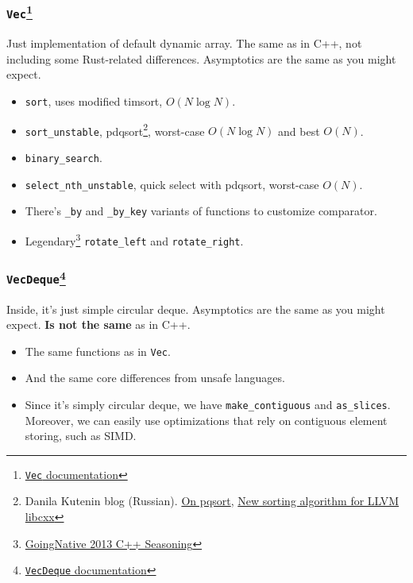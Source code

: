 \documentclass[aspectratio=1610,t]{beamer}
\begin{document}
\begin{frame}[fragile]
\frametitle{\texttt{Vec}\footnote{\href{https://doc.rust-lang.org/std/vec/struct.Vec.html}{\texttt{Vec} documentation}}}
Just implementation of default dynamic array. The same as in C++, not including some Rust-related differences. Asymptotics are the same as you might expect.

\begin{itemize}
    \item<3-> \texttt{sort}, uses modified timsort, $O(N\log N)$.
    \item<4-> \texttt{sort\_unstable}, pdqsort\footnote{Danila Kutenin blog (Russian). \href{https://t.me/experimentalchill/7}{On pqsort}, \href{https://t.me/experimentalchill/130}{New sorting algorithm for LLVM libcxx}}, worst-case $O(N\log N)$ and best $O(N)$.
    \item<5-> \texttt{binary\_search}.
    \item<6-> \texttt{select\_nth\_unstable}, quick select with pdqsort, worst-case $O(N)$.
    \item<7-> There's \texttt{\_by} and \texttt{\_by\_key} variants of functions to customize comparator.
    \item<8-> Legendary\footnote{\href{https://www.youtube.com/watch?v=W2tWOdzgXHA}{GoingNative 2013 C++ Seasoning}} \texttt{rotate\_left} and \texttt{rotate\_right}.
\end{itemize}
\end{frame}


\begin{frame}[fragile]
\frametitle{\texttt{VecDeque}\footnote{\href{https://doc.rust-lang.org/std/collections/struct.VecDeque.html}{\texttt{VecDeque} documentation}}}
Inside, it's just simple circular deque. Asymptotics are the same as you might expect. \textbf{Is not the same} as in C++.

\begin{itemize}
    \item<3-> The same functions as in \texttt{Vec}.
    \item<4-> And the same core differences from unsafe languages.
    \item<5-> Since it's simply circular deque, we have \texttt{make\_contiguous} and \texttt{as\_slices}. Moreover, we can easily use optimizations that rely on contiguous element storing, such as SIMD.
\end{itemize}
\end{frame}
\end{document}
